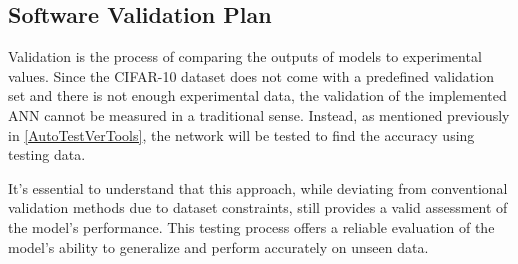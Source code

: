 \documentclass[12pt, titlepage]{article}
\begin{document}



\subsection{Software Validation Plan}\label{SoftwareValPlan}

Validation is the process of comparing the outputs of models to experimental values. 
Since the CIFAR-10 dataset \cite{CIFAR10} does not come with a predefined validation 
set and there is not enough experimental data, the validation of the implemented ANN 
cannot be measured in a traditional sense. Instead, as mentioned previously in \ref{AutoTestVerTools}, the network 
will be tested to find the accuracy using testing data. 

It's essential to understand that this approach, while deviating from 
conventional validation methods due 
to dataset constraints, still provides a valid assessment of the model's performance. 
This testing process offers a reliable evaluation of the model's ability to 
generalize and perform accurately on unseen data.



\end{document}
